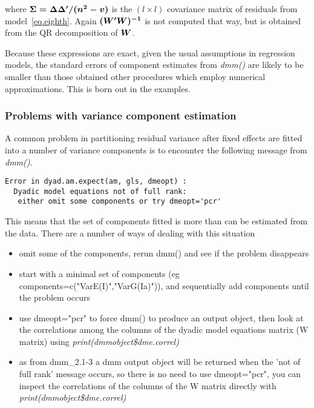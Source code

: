 \documentclass[titlepage]{article}  %
\begin{document}
where $\mbox{\boldmath $\Sigma = \Delta \Delta^{\prime}/(n^{2}-v)$}$ is the $(l \times l)$ covariance matrix of residuals from model~\ref{eq.eighth}. Again $\mbox{\boldmath $(W^{\prime}W)^{-1}$}$ is not computed that way, but is obtained from the QR decomposition of $\mbox{\boldmath $W$}$. 

Because these expressions are exact, given the usual assumptions in regression models, the standard errors of component estimates from {\em dmm()} are likely to be smaller than those obtained other procedures which employ numerical approximations. This is born out in the examples.

\subsubsection{Problems with variance component estimation}
A common problem in partitioning residual variance after fixed effects are fitted into a number of variance components is to encounter the following message from {\em dmm()}.
\begin{verbatim}
Error in dyad.am.expect(am, gls, dmeopt) : 
  Dyadic model equations not of full rank:
   either omit some components or try dmeopt='pcr' 
\end{verbatim}
This means that the set of components fitted is more than can be estimated from the data. There are a  number of ways of dealing with this situation
\begin{itemize}
\item omit some of the components, rerun dmm() and see if the problem disappears
\item start with a  minimal set of components (eg components=c("VarE(I)","VarG(Ia)")), and sequentially add components until the problem occurs
\item use dmeopt="pcr" to force dmm() to produce an output object, then look at the correlations among the columns of the dyadic model equations matrix (W matrix) using {\em print(dmmobject\$dme.correl)} 
\item as from dmm\_2.1-3 a dmm output object will be returned when the 'not of full rank' message occurs, so there is no need to use dmeopt="pcr", you can inspect the correlations of the columns of the W matrix directly with {\em print(dmmobject\$dme.correl)}
\end{itemize}
\end{document}
